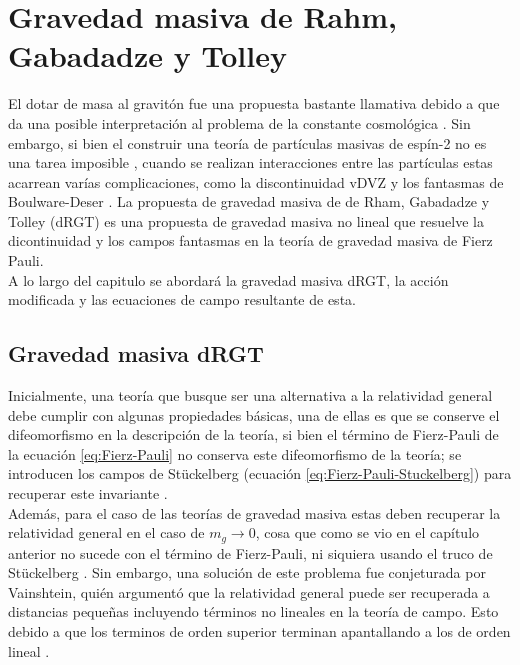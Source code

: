 \chapter{Gravedad masiva de Rahm,  Gabadadze y Tolley}
\label{chap:dRGT}

El dotar de masa al gravitón fue una propuesta bastante llamativa debido a que da una posible interpretación al problema de la constante cosmológica \cite{CosmologicalStudy1}. Sin embargo, si bien el construir una teoría de partículas masivas de espín-2 no es una tarea imposible \cite{MassiveGravity,TheoreticalAspectsOfMassiveGRavity}, cuando se realizan interacciones entre las partículas estas acarrean varías complicaciones, como la discontinuidad vDVZ y los fantasmas de Boulware-Deser \cite{MassiveGravity}. La propuesta de gravedad masiva de de Rham, Gabadadze y Tolley (dRGT) es una propuesta de gravedad masiva no lineal que resuelve la dicontinuidad y  los campos fantasmas en la teoría de gravedad masiva de Fierz Pauli.\\

A lo largo del capitulo se abordará la gravedad masiva dRGT, la acción modificada y las ecuaciones  de campo resultante de esta.

\section{Gravedad masiva dRGT}

Inicialmente, una teoría que busque ser una alternativa a la relatividad general debe cumplir con algunas propiedades básicas, una de ellas es que se conserve el difeomorfismo en la descripción de la teoría, si bien el término de Fierz-Pauli de la ecuación \eqref{eq:Fierz-Pauli} no conserva este difeomorfismo de la teoría; se introducen los campos de St\"{u}ckelberg (ecuación \eqref{eq:Fierz-Pauli-Stuckelberg}) para recuperar este invariante \cite{CosmologicalStudy1}.\\

Además, para el caso de las teorías de gravedad masiva estas deben recuperar la relatividad general en el caso de $m_g\rightarrow 0$, cosa que como se vio en el capítulo anterior no sucede con el término de Fierz-Pauli, ni siquiera usando el truco de St\"{u}ckelberg \cite{MassiveGravity}. Sin embargo, una solución de este problema fue conjeturada por Vainshtein, quién argumentó que la relatividad general puede ser recuperada a distancias pequeñas incluyendo términos no lineales en la teoría de campo. Esto debido a que los terminos de orden superior terminan apantallando a los de orden lineal \cite{VainshteinSol}.\\

